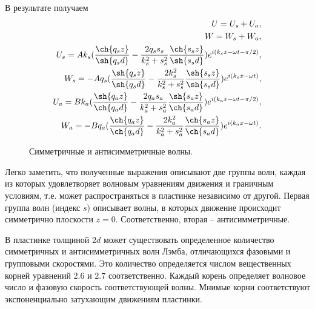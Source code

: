 В результате получаем
\begin{eqnarray}
U = U_s + U_a, \\
W = W_s + W_a, \\
U_s = A k_s( \frac{\ch{q_s z}}{\sh{q_s d}} - \frac{2 q_s s_s}{k_s^2+s_s^2} \frac{\ch{s_s z}}{\sh{s_s d}} ) e^{i(k_s x - \omega t - \pi/2)}, \\
W_s = - A q_s( \frac{\sh{q_s z}}{\sh{q_s d}} - \frac{2 k_s^2}{k_s^2+s_s^2} \frac{\sh{s_s z}}{\sh{s_s d}} ) e^{i(k_s x - \omega t)}, \\
U_a = B k_a( \frac{\sh{q_a z}}{\ch{q_a d}} - \frac{2 q_a s_a}{k_a^2+s_a^2} \frac{\sh{s_a z}}{\ch{s_a d}} ) e^{i(k_a x - \omega t - \pi/2)}, \\
W_a = - B q_a( \frac{\ch{q_a z}}{\ch{q_a d}} - \frac{2 k_a^2}{k_a^2+s_a^2} \frac{\ch{s_a z}}{\ch{s_a d}} ) e^{i(k_a x - \omega t)}.
\end{eqnarray}

\begin{figure}[h]
\caption{Симметричные и антисимметричные волны.}
\end{figure}

Легко заметить, что полученные выражения описывают две группы волн, каждая из которых удовлетворяет волновым уравнениям движения и граничным условиям, т.е. может распространяться в пластинке независимо от другой. Первая группа волн (индекс $s$) описывает волны, в которых движение происходит симметрично плоскости $z = 0$. Соответственно, вторая – антисимметричные. 

В пластинке толщиной $2d$ может существовать определенное количество симметричных и антисимметричных волн Лэмба, отличающихся фазовыми и групповыми скоростями. Это количество определяется числом вещественных корней уравнений 2.6 и 2.7 соответственно. Каждый корень определяет волновое число и фазовую скорость соответствующей волны. Мнимые корни соответствуют экспоненциально затухающим движениям пластинки.

